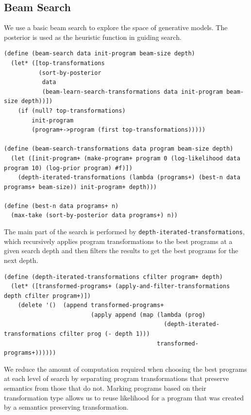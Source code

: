 \documentclass[a4paper,10pt]{article}
\begin{document}
\subsection{Beam Search}
We use a basic beam search to explore the space of generative models.  The posterior is used as the heuristic function in guiding search.
\begin{lstlisting}[frame=trBL]
(define (beam-search data init-program beam-size depth)
  (let* ([top-transformations 
          (sort-by-posterior
           data 
           (beam-learn-search-transformations data init-program beam-size depth))])
    (if (null? top-transformations)
        init-program
        (program+->program (first top-transformations)))))

(define (beam-search-transformations data program beam-size depth)
  (let ([init-program+ (make-program+ program 0 (log-likelihood data program 10) (log-prior program) #f)])
    (depth-iterated-transformations (lambda (programs+) (best-n data programs+ beam-size)) init-program+ depth)))

(define (best-n data programs+ n)
  (max-take (sort-by-posterior data programs+) n))
\end{lstlisting}
The main part of the search is performed by \texttt{depth-iterated-transformations}, which recursively applies program transformations to the best programs at a given search depth and then filters the results to get the best programs for the next depth.
\begin{lstlisting}[frame=trBL]
(define (depth-iterated-transformations cfilter program+ depth)
  (let* ([transformed-programs+ (apply-and-filter-transformations depth cfilter program+)])
    (delete '()  (append transformed-programs+
                         (apply append (map (lambda (prog) 
                                              (depth-iterated-transformations cfilter prog (- depth 1))) 
                                            transformed-programs+))))))
\end{lstlisting}
We reduce the amount of computation required when choosing the best programs at each level of search by separating program transformations that preserve semantics from those that do not.  Marking programs based on their transformation type allows us to reuse likelihood for a program that was created by a semantics preserving transformation.
\end{document}
